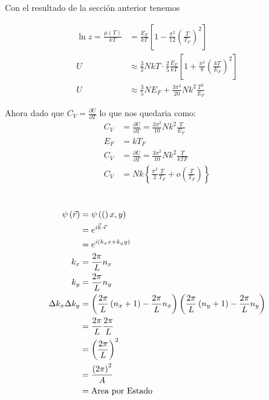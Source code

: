 \documentclass{report}
\begin{document}
Con el resultado de la sección anterior tenemos

\begin{align*}
  \ln z = \frac{\mu(T)}{kT} &= \frac{E_F}{kT} \left[ 1 - \frac{\pi^2}{12} \left( \frac{T}{T_F} \right)^2 \right]\\
  U &\approx \frac{3}{2} NkT \cdot \frac{2}{5} \frac{E_F}{kT} \left[ 1 + \frac{\pi^2}{8} \left( \frac{kT}{E_F} \right)^2 \right]\\
  U &\approx \frac{3}{5} N E_F + \frac{3\pi^2}{20} Nk^2 \frac{T^2}{E_F}
\end{align*}

Ahora dado que $C_V = \frac{\partial U}{\partial T}$ lo que nos quedaria como:
\begin{align*}
  C_V &= \frac{\partial U}{\partial T} = \frac{3\pi^2}{10} Nk^2 \frac{T}{E_F}\\
  E_F &= kT_F\\
  C_V &= \frac{\partial U}{\partial T} = \frac{3\pi^2}{10} Nk^2 \frac{T}{kTF}\\
  C_V &= Nk \left\{\frac{\pi^2}{2} \frac{T}{T_F} + o\left( \frac{T}{T_F} \right)\right\}
\end{align*}


\section{}

\chapter{}

\section{}

\begin{align*}
  \psi\left(\vec{r}\right) &= \psi\left((\right)x, y)\\
  &= e^{i\vec{k}\cdot \vec{r}}\\
  &= e^{i\left(k_x x + k_y y\right)}\\
  k_x &= \frac{2\pi}{L}n_x\\
  k_y &= \frac{2\pi}{L}n_y\\
  \Delta k_x \Delta k_y &= \left(\frac{2\pi}{L}\left(n_x + 1\right) - \frac{2\pi}{L}n_x\right)\left(\frac{2\pi}{L}\left(n_y + 1\right) - \frac{2\pi}{L}n_y\right)\\
  &= \frac{2\pi}{L}\frac{2\pi}{L}\\
  &= \left(\frac{2\pi}{L}\right)^2\\
  &= \frac{\left(2\pi\right)^2}{A}\\
  &= \text{Area por Estado}
\end{align*}
\end{document}
